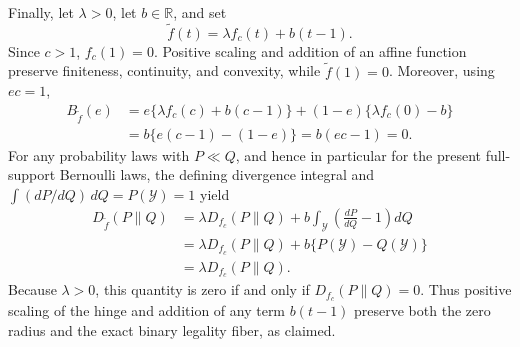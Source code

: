 Finally, let \(\lambda>0\), let \(b\in\mathbb R\), and set
\[
\widetilde f(t)=\lambda f_c(t)+b(t-1).
\]
Since \(c>1\), \(f_c(1)=0\).  Positive scaling and addition of an affine
function preserve finiteness, continuity, and convexity, while
\(\widetilde f(1)=0\).  Moreover, using \(ec=1\),
\[
\begin{aligned}
B_{\widetilde f}(e)
&=e\{\lambda f_c(c)+b(c-1)\}
 +(1-e)\{\lambda f_c(0)-b\}\\
&=b\{e(c-1)-(1-e)\}=b(ec-1)=0.
\end{aligned}
\]
For any probability laws with \(P\ll Q\), and hence in particular for
the present full-support Bernoulli laws, the defining divergence integral
and \(\int(dP/dQ)\,dQ=P(\mathcal Y)=1\) yield
\[
\begin{aligned}
D_{\widetilde f}(P\|Q)
&=\lambda D_{f_c}(P\|Q)
 +b\int_{\mathcal Y}\left(\frac{dP}{dQ}-1\right)dQ\\
&=\lambda D_{f_c}(P\|Q)
 +b\{P(\mathcal Y)-Q(\mathcal Y)\}\\
&=\lambda D_{f_c}(P\|Q).
\end{aligned}
\]
Because \(\lambda>0\), this quantity is zero if and only if
\(D_{f_c}(P\|Q)=0\).  Thus positive scaling of the hinge and addition of
any term \(b(t-1)\) preserve both the zero radius and the exact binary
legality fiber, as claimed.